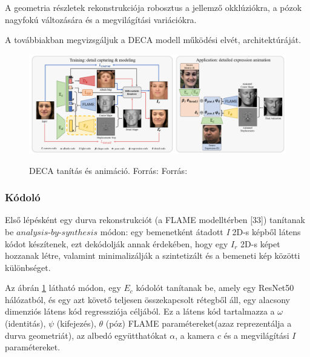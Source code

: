 \documentclass[12pt,a4]{article}
\begin{document}
 	A geometria részletek rekonstrukciója robosztus a jellemző okklúziókra,
 	a pózok nagyfokú változására és a megvilágítási variációkra.
 	
 	A továbbiakban megvizsgáljuk a DECA modell működési elvét, architektúráját.
 	
 	\begin{figure}[h]	
 		\centering
 		\includegraphics[width=1\linewidth]{deca}
 		\label{fig:deca}
 		\caption{ DECA tanítás és animáció. Forrás: 
 			Forrás:\cite{deca}}
 	\end{figure}
 	
	 \subsubsection{Kódoló}
	 Első lépésként egy durva rekonstrukciót (a FLAME modelltérben [33])
	 tanítanak be $analysis$-$by$-$synthesis$ módon: egy bemenetként átadott \textit{I} 2D-s képből látens kódot készítenek, ezt dekódolják annak érdekében, hogy egy $I_{r}$ 2D-s képet hozzanak létre, valamint minimalizálják a szintetizált és a bemeneti kép közötti különbséget.
	 
	 Az ábrán \ref{fig:deca} látható módon, egy $E_{c}$ kódolót tanítanak be, amely egy ResNet50 \cite{liwen} hálózatból, és egy azt követő teljesen összekapcsolt rétegből áll, egy alacsony dimenziós látens kód regressziója céljából. Ez a látens kód tartalmazza a $\omega$ (identitás), $\psi$ (kifejezés), $\theta$ (póz) FLAME \cite{tianye} paramétereket(azaz reprezentálja a durva geometriát), az albedó együtthatókat $\alpha$, a kamera $c$ és a megvilágítási $I$ paramétereket.\\
	 
\end{document}

